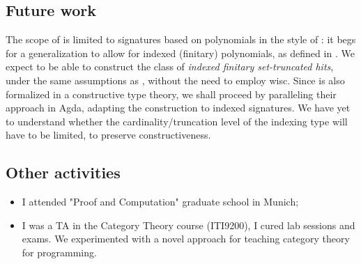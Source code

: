 \documentclass[a4paper]{article}
\begin{document}
\subsection{Future work}

The scope of \cite{Weide2019} is limited to signatures based on polynomials in the style of \cite{Goldblatt2001}: it begs for a generalization to allow for indexed (finitary) polynomials, as defined in \cite{Altenkirch2015}.
We expect to be able to construct the class of \emph{indexed finitary set-truncated \glspl{hit}}, under the same assumptions as \cite{Weide2019}, without the need to employ \gls{wisc}. Since \cite{Weide2019} is also formalized in a constructive type theory, we shall proceed by paralleling their approach in Agda, adapting the construction to indexed signatures. We have yet to understand whether the cardinality/truncation level of the indexing type will have to be limited, to preserve constructiveness.

\subsection{Other activities}

\begin{itemize}
	\item I attended "Proof and Computation" graduate school in Munich;
	\item I was a TA in the Category Theory course (ITI9200), I cured lab sessions and exams. We experimented with a novel approach for teaching category theory for programming.
\end{itemize}
\printacronyms
\printbibliography
\end{document}
